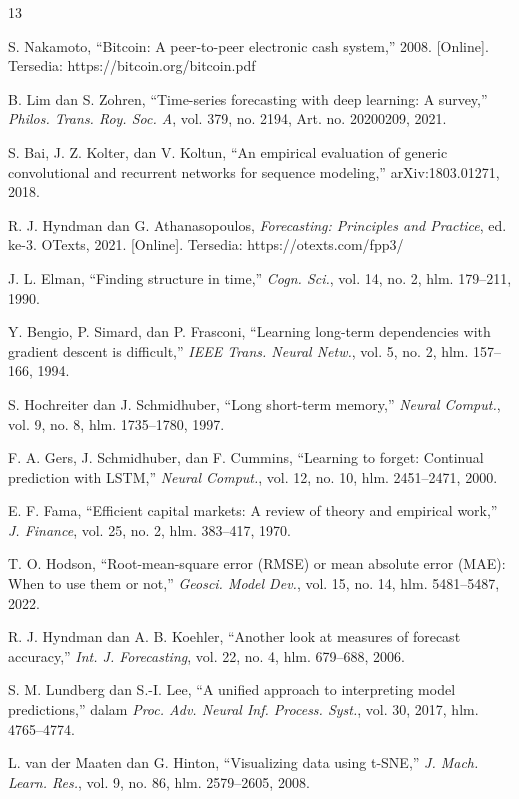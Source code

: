 \documentclass[conference,a4paper]{IEEEtran}
\begin{document}
\begin{thebibliography}{13}

S. Nakamoto, ``Bitcoin: A peer-to-peer electronic cash system,'' 2008. [Online]. Tersedia: https://bitcoin.org/bitcoin.pdf

B. Lim dan S. Zohren, ``Time-series forecasting with deep learning: A survey,'' \textit{Philos. Trans. Roy. Soc. A}, vol. 379, no. 2194, Art. no. 20200209, 2021.

S. Bai, J. Z. Kolter, dan V. Koltun, ``An empirical evaluation of generic convolutional and recurrent networks for sequence modeling,'' arXiv:1803.01271, 2018.

R. J. Hyndman dan G. Athanasopoulos, \textit{Forecasting: Principles and Practice}, ed. ke-3. OTexts, 2021. [Online]. Tersedia: https://otexts.com/fpp3/

J. L. Elman, ``Finding structure in time,'' \textit{Cogn. Sci.}, vol. 14, no. 2, hlm. 179--211, 1990.

Y. Bengio, P. Simard, dan P. Frasconi, ``Learning long-term dependencies with gradient descent is difficult,'' \textit{IEEE Trans. Neural Netw.}, vol. 5, no. 2, hlm. 157--166, 1994.

S. Hochreiter dan J. Schmidhuber, ``Long short-term memory,'' \textit{Neural Comput.}, vol. 9, no. 8, hlm. 1735--1780, 1997.

F. A. Gers, J. Schmidhuber, dan F. Cummins, ``Learning to forget: Continual prediction with LSTM,'' \textit{Neural Comput.}, vol. 12, no. 10, hlm. 2451--2471, 2000.

E. F. Fama, ``Efficient capital markets: A review of theory and empirical work,'' \textit{J. Finance}, vol. 25, no. 2, hlm. 383--417, 1970.

T. O. Hodson, ``Root-mean-square error (RMSE) or mean absolute error (MAE): When to use them or not,'' \textit{Geosci. Model Dev.}, vol. 15, no. 14, hlm. 5481--5487, 2022.

R. J. Hyndman dan A. B. Koehler, ``Another look at measures of forecast accuracy,'' \textit{Int. J. Forecasting}, vol. 22, no. 4, hlm. 679--688, 2006.

S. M. Lundberg dan S.-I. Lee, ``A unified approach to interpreting model predictions,'' dalam \textit{Proc. Adv. Neural Inf. Process. Syst.}, vol. 30, 2017, hlm. 4765--4774.

L. van der Maaten dan G. Hinton, ``Visualizing data using t-SNE,'' \textit{J. Mach. Learn. Res.}, vol. 9, no. 86, hlm. 2579--2605, 2008.

\end{thebibliography}
\end{document}
